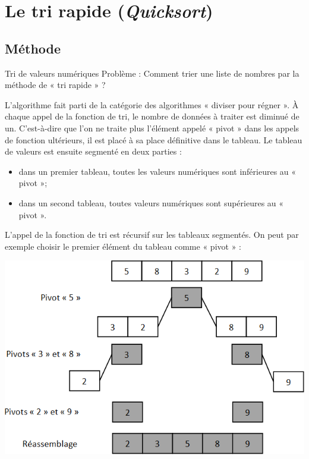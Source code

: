 \documentclass[10pt,fleqn]{article} %
\begin{document}

\section{Le tri rapide (\textit{Quicksort})}

\subsection{Méthode}

\begin{exemple}
Tri de valeurs numériques
Problème : Comment trier une liste de nombres par la méthode de « tri rapide » ?
\end{exemple}
\begin{minipage}[c]{.48\linewidth}
L'algorithme fait parti de la catégorie des algorithmes « diviser pour régner ».
À chaque appel de la fonction de tri, le nombre de données à traiter est diminué de un. C'est-à-dire que l'on ne traite plus l'élément appelé « pivot » dans les appels de fonction ultérieurs, il est placé à sa place définitive dans le tableau.
Le tableau de valeurs est ensuite segmenté en deux parties :
\begin{itemize}
\item dans un premier tableau, toutes les valeurs numériques sont inférieures au « pivot »;
\item dans un second tableau, toutes valeurs numériques sont supérieures au « pivot ».
\end{itemize}

L'appel de la fonction de tri est récursif sur les tableaux segmentés.
On peut par exemple choisir le premier élément du tableau comme « pivot » :
\end{minipage} \hfill
\begin{minipage}[c]{.48\linewidth}
\begin{center}
\includegraphics[width=\linewidth]{images/graphe_1}
\end{center}
\end{minipage}
\end{document}
